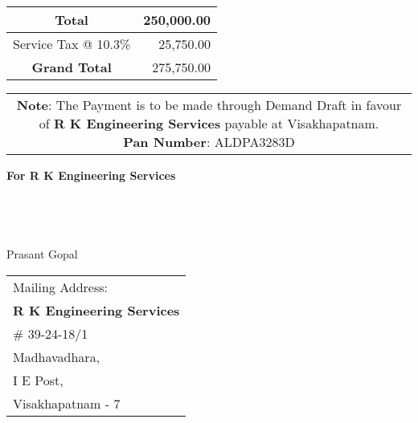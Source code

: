 \documentclass[11pt]{article}
\begin{document}
\vspace*{0.3cm}

\hspace*{11.45cm}
\begin{tabular}{|c|r|}
\hline
Total & 250,000.00 \\
\hline
Service Tax @ 10.3\% & 25,750.00 \\
\hline
{\bf Grand Total} & 275,750.00 \\
\hline
\end{tabular}

\vspace*{-1 cm}
\begin{tabular}{c}
\parbox{4in}{ {\bf Note}: The Payment is to be made through Demand Draft in favour of {\bf R K Engineering Services} payable at Visakhapatnam. \\
{\noindent \bf Pan Number}:  ALDPA3283D }\\
\end{tabular}
\vspace*{55pt}


{\bf For  R K Engineering Services } \\ \\ \\ \\ \\
 \hspace*{0.6cm}Prasant Gopal
\vspace*{-70pt}
\begin{flushright}
\begin{tabular}{l}
Mailing Address:\\
{\bf R K Engineering Services}\\
\# 39-24-18/1\\
Madhavadhara, \\ 
I E Post, \\
Visakhapatnam - 7\\
\end{tabular}
\end{flushright}
\end{document}
